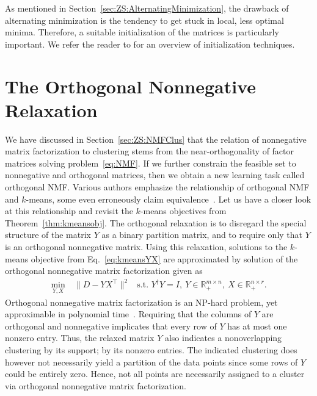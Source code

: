 As mentioned in Section~\ref{sec:ZS:AlternatingMinimization}, the drawback of alternating minimization is the tendency to get stuck in local, less optimal minima. Therefore, a suitable initialization of the matrices is particularly important. We refer the reader to \cite{celebi2013comparative} for an overview of initialization techniques. 
\section{The Orthogonal Nonnegative  Relaxation}\label{sec:ZS:OrthogonalRelaxation} 
We have discussed in Section~\ref{sec:ZS:NMFClus} that the relation of nonnegative matrix factorization to clustering stems from the near-orthogonality of factor matrices solving problem~\eqref{eq:NMF}. If we further constrain the feasible set to nonnegative and orthogonal  matrices, then we obtain a new learning task called orthogonal NMF.
Various authors emphasize the relationship of orthogonal NMF and $k$-means, some even erroneously claim equivalence~\citep{ding2005equivalence, ding2006orthogonal, li2006relationships}. Let us have a closer look at this relationship and revisit the $k$-means objectives from Theorem~\ref{thm:kmeansobj}. The orthogonal relaxation is to disregard the special structure of the matrix $Y$ as a binary partition matrix, and to require only that $Y$ is an orthogonal nonnegative matrix. Using this relaxation, solutions to the $k$-means objective from Eq.~\eqref{eq:kmeansYX} are approximated by solution of the orthogonal nonnegative matrix factorization given as
\begin{align}\label{eq:ONMF}
    \min_{Y,X} &\ \|D-YX^\top\|^2 &\text{s.t. } Y^\dagger Y=I,\  Y\in\mathbb{R}_+^{m\times n},\  X\in\mathbb{R}_+^{n\times r}.
\end{align}
Orthogonal nonnegative matrix factorization is an NP-hard problem, yet approximable in polynomial time~\cite{asteris2015orthogonal}.
Requiring that the columns of $Y$ are orthogonal and nonnegative implicates that every row of $Y$ has at most one nonzero entry. Thus, the relaxed matrix $Y$ also indicates a nonoverlapping clustering by its support; by its nonzero entries. The indicated clustering does however not necessarily yield a partition of the data points since some rows of $Y$ could be entirely zero. Hence, not all points are necessarily assigned to a cluster via orthogonal nonnegative matrix factorization.

